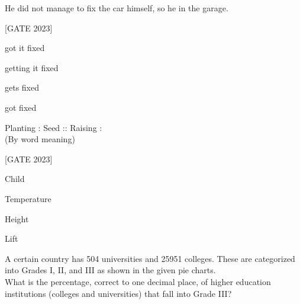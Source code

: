 \iffalse
\title{2023-ME}
\author{EE24BTECH11020 -  Ellanti Rohith}
\section{me}
\chapter{2023}
\fi
\item He did not manage to fix the car himself, so he \underline{\hspace{2cm}} in the garage.
    
    \hfill{[GATE 2023]}\begin{enumerate}
    \begin{multicols}{2}
        \item got it fixed
        \item getting it fixed
        \item gets fixed
        \item got fixed
        \end{multicols}
    \end{enumerate}

     \item Planting : Seed :: Raising : \underline{\hspace{2cm}} \\
    (By word meaning)

    \hfill{[GATE 2023]}\begin{enumerate}
    \begin{multicols}{2}
        \item Child
        \item Temperature
        \item Height
        \item Lift
        \end{multicols}
    \end{enumerate}


\item A certain country has 504 universities and 25951 colleges. These are categorized into Grades I, II, and III as shown in the given pie charts.\\ What is the percentage, correct to one decimal place, of higher education institutions (colleges and universities) that fall into Grade III?

